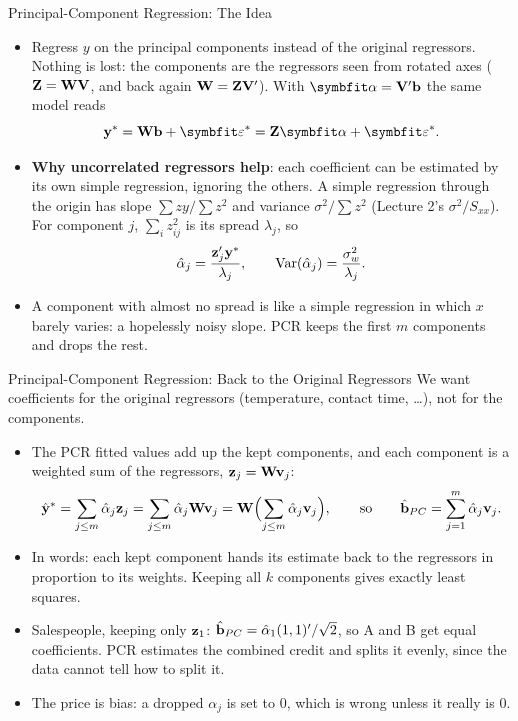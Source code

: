 \begin{frame}{Principal-Component Regression: The Idea}
    \footnotesize
    \begin{itemize}
        \setlength{\itemsep}{0.3em}
        \item Regress $y$ on the principal components instead of the original regressors. Nothing is lost: the components are the regressors seen from rotated axes ($\mathbf{Z}=\mathbf{W}\mathbf{V}$, and back again $\mathbf{W}=\mathbf{Z}\mathbf{V}'$). With $\balpha=\bV'\bb$ the same model reads
        \[
        \by^*=\bW\bb+\bvarepsilon^*=\bZ\balpha+\bvarepsilon^* .
        \]
        \item \textbf{Why uncorrelated regressors help}: each coefficient can be estimated by its own simple regression, ignoring the others. A simple regression through the origin has slope $\sum zy/\sum z^2$ and variance $\sigma^2/\sum z^2$ (Lecture 2's $\sigma^2/S_{xx}$). For component $j$, $\sum_iz_{ij}^2$ is its spread $\lambda_j$, so
        \[
        \hat\alpha_j=\frac{\mathbf{z}_j'\mathbf{y}^*}{\lambda_j},\qquad \operatorname{Var}(\hat\alpha_j)=\frac{\sigma_w^2}{\lambda_j} .
        \]
        \item A component with almost no spread is like a simple regression in which $x$ barely varies: a hopelessly noisy slope. PCR keeps the first $m$ components and drops the rest.
    \end{itemize}
\end{frame}


\begin{frame}{Principal-Component Regression: Back to the Original Regressors}
    \footnotesize
    We want coefficients for the original regressors (temperature, contact time, \dots), not for the components.
    \begin{itemize}
        \setlength{\itemsep}{0.3em}
        \item The PCR fitted values add up the kept components, and each component is a weighted sum of the regressors, $\mathbf{z}_j=\mathbf{W}\mathbf{v}_j$:
        \[
        \hat{\mathbf{y}}^*=\sum_{j\le m}\hat\alpha_j\mathbf{z}_j=\sum_{j\le m}\hat\alpha_j\mathbf{W}\mathbf{v}_j=\mathbf{W}\Bigl(\sum_{j\le m}\hat\alpha_j\mathbf{v}_j\Bigr),
        \qquad\text{so}\qquad
        \hat{\mathbf{b}}_{PC}=\sum_{j=1}^m\hat\alpha_j\mathbf{v}_j .
        \]
        \item In words: each kept component hands its estimate back to the regressors in proportion to its weights. Keeping all $k$ components gives exactly least squares.
        \item Salespeople, keeping only $\mathbf{z}_1$: $\hat{\mathbf{b}}_{PC}=\hat\alpha_1(1,1)'/\sqrt2$, so A and B get equal coefficients. PCR estimates the combined credit and splits it evenly, since the data cannot tell how to split it.
        \item The price is bias: a dropped $\alpha_j$ is set to 0, which is wrong unless it really is 0.
    \end{itemize}
\end{frame}


